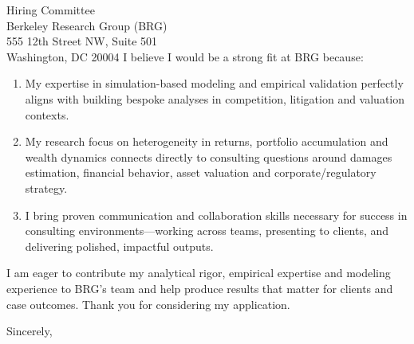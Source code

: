 \documentclass[11pt,letterpaper]{letter}
\begin{document}
\begin{letter}{Hiring Committee \\
Berkeley Research Group (BRG) \\
555 12th Street NW, Suite 501 \\
Washington, DC 20004}
I believe I would be a strong fit at BRG because:
\begin{enumerate}
    \item My expertise in simulation-based modeling and empirical validation perfectly aligns with building bespoke analyses in competition, litigation and valuation contexts.
    \item My research focus on heterogeneity in returns, portfolio accumulation and wealth dynamics connects directly to consulting questions around damages estimation, financial behavior, asset valuation and corporate/regulatory strategy.
    \item I bring proven communication and collaboration skills necessary for success in consulting environments—working across teams, presenting to clients, and delivering polished, impactful outputs.
\end{enumerate}

I am eager to contribute my analytical rigor, empirical expertise and modeling experience to BRG’s team and help produce results that matter for clients and case outcomes. Thank you for considering my application.

\closing{Sincerely,}

\end{letter}
\end{document}
